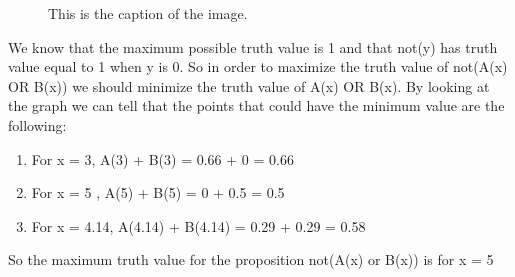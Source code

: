 \documentclass{article}
\begin{document}
\begin{figure}[h]
    \centering
    \caption{This is the caption of the image.}
    
\end{figure}

\noindent \newline We know that the maximum possible truth value is 1 and that not(y) has truth value equal to 1 when y is 0. So in order to 
maximize the truth value of not(A(x) OR B(x)) we should minimize the truth value of A(x) OR B(x). By looking at the graph we can tell that the points that could have the minimum value are the following: \\
\begin{enumerate}
  \item For x = 3, A(3) + B(3) = 0.66 + 0 = 0.66
  \item For x = 5 , A(5) + B(5) = 0 + 0.5 = 0.5
  \item For x = 4.14, A(4.14) + B(4.14) = 0.29 + 0.29 = 0.58
\end{enumerate}
So the maximum truth value for the proposition not(A(x) or B(x)) is for x = 5
\end{document}
